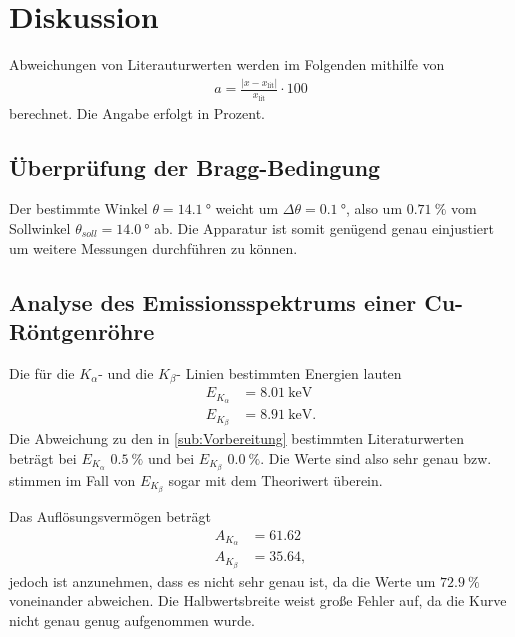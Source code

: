 \section{Diskussion}
\label{sec:Diskussion}

Abweichungen von Literauturwerten werden im Folgenden mithilfe von
\begin{align*}
    a=\frac{|x-x_{\text{lit}}|}{x_{\text{lit}}}\cdot 100 \label{eqn:abweich}
\end{align*}
berechnet. Die Angabe erfolgt in Prozent.

\subsection{Überprüfung der Bragg-Bedingung} %
\label{sub:Bragg_dis}
Der bestimmte Winkel $\theta=\qty{14.1}{\degree}$ weicht um $\Delta \theta =\qty{0.1}{\degree}$, also um $\qty{0.71}{\percent}$
vom Sollwinkel $\theta_{soll}=\qty{14.0}{\degree}$ ab.
Die Apparatur ist somit genügend genau einjustiert um weitere Messungen durchführen zu können.


\subsection{Analyse des Emissionsspektrums einer Cu-Röntgenröhre} %
\label{sub:Emission_dis}

Die für die $K_\alpha$- und die $K_\beta$- Linien bestimmten Energien lauten
\begin{align*}
    E_{K_\alpha}&= \qty{8.01}{\kilo\electronvolt}\\
    E_{K_\beta}&= \qty{8.91}{\kilo\electronvolt}.
\end{align*} 
Die Abweichung zu den in \autoref{sub:Vorbereitung} bestimmten Literaturwerten beträgt bei $E_{K_\alpha}$ $\qty{0.5}{\percent}$
und bei $E_{K_\beta}$ $\qty{0.0}{\percent}$. Die Werte sind also sehr genau bzw. stimmen im Fall von $E_{K_\beta}$ sogar mit dem
Theoriwert überein.

Das Auflösungsvermögen beträgt
\begin{align*}
    A_{K_\alpha} &= 61.62\\
    A_{K_\beta} &= 35.64,
\end{align*}
jedoch ist anzunehmen, dass es nicht sehr genau ist, da die Werte um $\qty{72.9}{\percent}$ voneinander abweichen.
Die Halbwertsbreite weist große Fehler auf, da die Kurve nicht genau genug aufgenommen wurde.
